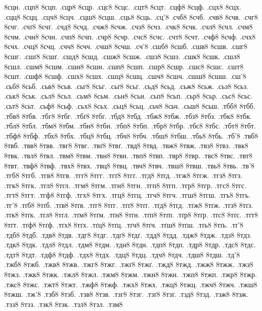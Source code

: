 {8сцн.
.сцп8
8сцп.
.сцр8
8сцр.
.сцс8
8сцс.
.сцт8
8сцт.
.сцф8
8сцф.
.сцх8
8сцх.
.сцц8
8сцц.
.сцч8
8сцч.
.сцш8
8сцш.
.сць8
8сць.
.сц'8
.счб8
8счб.
.счв8
8счв.
.счг8
8счг.
.счґ8
8счґ.
.счд8
8счд.
.счж8
8счж.
.счз8
8счз.
.счк8
8счк.
.счл8
8счл.
.счм8
8счм.
.счн8
8счн.
.счп8
8счп.
.счр8
8счр.
.счс8
8счс.
.счт8
8счт.
.счф8
8счф.
.счх8
8счх.
.счц8
8счц.
.счч8
8счч.
.счш8
8счш.
.сч'8
.сшб8
8сшб.
.сшв8
8сшв.
.сшг8
8сшг.
.сшґ8
8сшґ.
.сшд8
8сшд.
.сшж8
8сшж.
.сшз8
8сшз.
.сшк8
8сшк.
.сшл8
8сшл.
.сшм8
8сшм.
.сшн8
8сшн.
.сшп8
8сшп.
.сшр8
8сшр.
.сшс8
8сшс.
.сшт8
8сшт.
.сшф8
8сшф.
.сшх8
8сшх.
.сшц8
8сшц.
.сшч8
8сшч.
.сшш8
8сшш.
.сш'8
.сьб8
8сьб.
.сьв8
8сьв.
.сьг8
8сьг.
.сьґ8
8сьґ.
.сьд8
8сьд.
.сьж8
8сьж.
.сьз8
8сьз.
.ськ8
8ськ.
.сьл8
8сьл.
.сьм8
8сьм.
.сьн8
8сьн.
.сьп8
8сьп.
.сьр8
8сьр.
.сьс8
8сьс.
.сьт8
8сьт.
.сьф8
8сьф.
.сьх8
8сьх.
.сьц8
8сьц.
.сьч8
8сьч.
.сьш8
8сьш.
.тбб8
8тбб.
.тбв8
8тбв.
.тбг8
8тбг.
.тбґ8
8тбґ.
.тбд8
8тбд.
.тбж8
8тбж.
.тбз8
8тбз.
.тбк8
8тбк.
.тбл8
8тбл.
.тбм8
8тбм.
.тбн8
8тбн.
.тбп8
8тбп.
.тбр8
8тбр.
.тбс8
8тбс.
.тбт8
8тбт.
.тбф8
8тбф.
.тбх8
8тбх.
.тбц8
8тбц.
.тбч8
8тбч.
.тбш8
8тбш.
.тбь8
8тбь.
.тб'8
.твб8
8твб.
.твв8
8твв.
.твг8
8твг.
.твґ8
8твґ.
.твд8
8твд.
.твж8
8твж.
.твз8
8твз.
.твк8
8твк.
.твл8
8твл.
.твм8
8твм.
.твн8
8твн.
.твп8
8твп.
.твр8
8твр.
.твс8
8твс.
.твт8
8твт.
.твф8
8твф.
.твх8
8твх.
.твц8
8твц.
.твч8
8твч.
.твш8
8твш.
.твь8
8твь.
.тв'8
.тгб8
8тгб.
.тгв8
8тгв.
.тгг8
8тгг.
.тгґ8
8тгґ.
.тгд8
8тгд.
.тгж8
8тгж.
.тгз8
8тгз.
.тгк8
8тгк.
.тгл8
8тгл.
.тгм8
8тгм.
.тгн8
8тгн.
.тгп8
8тгп.
.тгр8
8тгр.
.тгс8
8тгс.
.тгт8
8тгт.
.тгф8
8тгф.
.тгх8
8тгх.
.тгц8
8тгц.
.тгч8
8тгч.
.тгш8
8тгш.
.тгь8
8тгь.
.тг'8
.тґб8
8тґб.
.тґв8
8тґв.
.тґг8
8тґг.
.тґґ8
8тґґ.
.тґд8
8тґд.
.тґж8
8тґж.
.тґз8
8тґз.
.тґк8
8тґк.
.тґл8
8тґл.
.тґм8
8тґм.
.тґн8
8тґн.
.тґп8
8тґп.
.тґр8
8тґр.
.тґс8
8тґс.
.тґт8
8тґт.
.тґф8
8тґф.
.тґх8
8тґх.
.тґц8
8тґц.
.тґч8
8тґч.
.тґш8
8тґш.
.тґь8
8тґь.
.тґ'8
.тдб8
8тдб.
.тдв8
8тдв.
.тдг8
8тдг.
.тдґ8
8тдґ.
.тдд8
8тдд.
.тдж8
8тдж.
.тдз8
8тдз.
.тдк8
8тдк.
.тдл8
8тдл.
.тдм8
8тдм.
.тдн8
8тдн.
.тдп8
8тдп.
.тдр8
8тдр.
.тдс8
8тдс.
.тдт8
8тдт.
.тдф8
8тдф.
.тдх8
8тдх.
.тдц8
8тдц.
.тдч8
8тдч.
.тдш8
8тдш.
.тд'8
.тжб8
8тжб.
.тжв8
8тжв.
.тжг8
8тжг.
.тжґ8
8тжґ.
.тжд8
8тжд.
.тжж8
8тжж.
.тжз8
8тжз.
.тжк8
8тжк.
.тжл8
8тжл.
.тжм8
8тжм.
.тжн8
8тжн.
.тжп8
8тжп.
.тжр8
8тжр.
.тжс8
8тжс.
.тжт8
8тжт.
.тжф8
8тжф.
.тжх8
8тжх.
.тжц8
8тжц.
.тжч8
8тжч.
.тжш8
8тжш.
.тж'8
.тзб8
8тзб.
.тзв8
8тзв.
.тзг8
8тзг.
.тзґ8
8тзґ.
.тзд8
8тзд.
.тзж8
8тзж.
.тзз8
8тзз.
.тзк8
8тзк.
.тзл8
8тзл.
.тзм8
}
